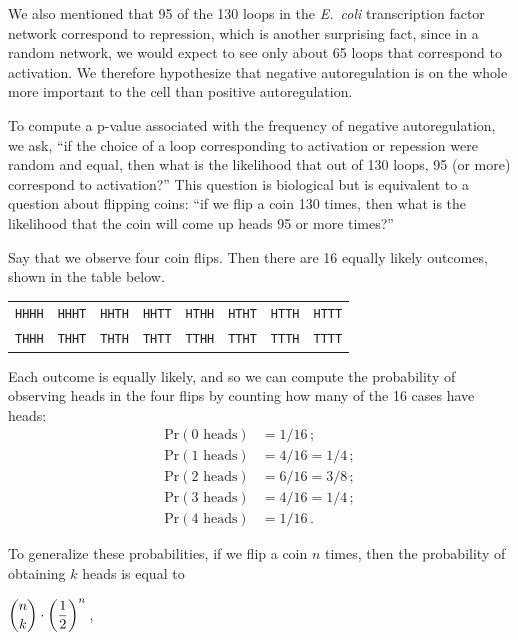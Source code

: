We also mentioned that 95 of the 130 loops in the \textit{E.~coli} transcription factor network correspond to repression, which is another surprising fact, since in a random network, we would expect to see only about 65 loops that correspond to activation. We therefore hypothesize that negative autoregulation is on the whole more important to the cell than positive autoregulation.

To compute a p-value associated with the frequency of negative autoregulation, we ask, ``if the choice of a loop corresponding to activation or repession were random and equal, then what is the likelihood that out of 130 loops, 95 (or more) correspond to activation?'' This question is biological but is equivalent to a question about flipping coins: ``if we flip a coin 130 times, then what is the likelihood that the coin will come up heads 95 or more times?''

Say that we observe four coin flips. Then there are 16 equally likely outcomes, shown in the table below.

\begin{center}
\begin{tabular}{c c c c c c c c}
\texttt{HHHH} & \texttt{HHHT} & \texttt{HHTH} & \texttt{HHTT} & \texttt{HTHH} & \texttt{HTHT} & \texttt{HTTH} & \texttt{HTTT}\\
\texttt{THHH} & \texttt{THHT} & \texttt{THTH} & \texttt{THTT} & \texttt{TTHH} & \texttt{TTHT} & \texttt{TTTH} & \texttt{TTTT}\\
\end{tabular}
\end{center}

\noindent Each outcome is equally likely, and so we can compute the probability of observing  heads in the four flips by counting how many of the 16 cases have  heads:
\begin{align*}
\mathrm{Pr}(\text{0 heads}) &= 1/16\,;\\
\mathrm{Pr}(\text{1 heads}) & = 4/16 = 1/4\,;\\
\mathrm{Pr}(\text{2 heads}) & = 6/16 = 3/8\,;\\
\mathrm{Pr}(\text{3 heads}) & = 4/16 = 1/4\,;\\
\mathrm{Pr}(\text{4 heads}) & = 1/16\,.
\end{align*}

To generalize these probabilities, if we flip a coin $n$ times, then the probability of obtaining $k$ heads is equal to 

\begin{center}
$\dbinom{n}{k} \cdot \left(\dfrac{1}{2}\right)^n$\,,
\end{center}


